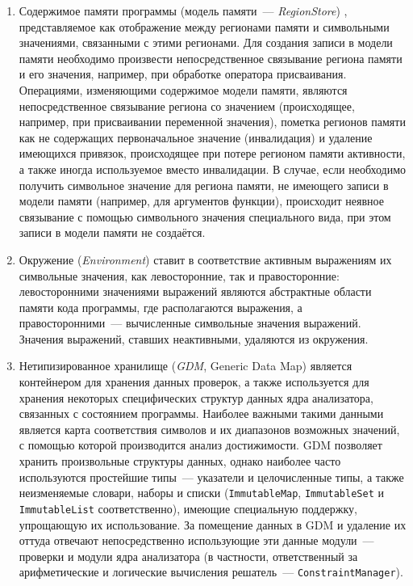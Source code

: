 \begin{enumerate}
 \item Содержимое памяти программы (модель памяти~--- \textit{RegionStore}) \cite{csa-store}, представляемое как отображение между регионами памяти и символьными значениями, связанными с этими регионами. Для создания записи в модели памяти необходимо произвести непосредственное связывание региона памяти и его значения, например, при обработке оператора присваивания. Операциями, изменяющими содержимое модели памяти, являются непосредственное связывание региона со значением (происходящее, например, при присваивании переменной значения), пометка регионов памяти как не содержащих первоначальное значение (инвалидация) и удаление имеющихся привязок, происходящее при потере регионом памяти активности, а также иногда используемое вместо инвалидации. В случае, если необходимо получить символьное значение для региона памяти, не имеющего записи в модели памяти (например, для аргументов функции), происходит неявное связывание с помощью символьного значения специального вида, при этом записи в модели памяти не создаётся.

 \item Окружение (\textit{Environment}) ставит в соответствие активным выражениям их символьные значения, как левосторонние, так и правосторонние: левосторонними значениями выражений являются абстрактные области памяти кода программы, где располагаются выражения, а правосторонними~--- вычисленные символьные значения выражений. Значения выражений, ставших неактивными, удаляются из окружения.
 
 \item Нетипизированное хранилище (\textit{GDM}, Generic Data Map) является контейнером для хранения данных проверок, а также используется для хранения некоторых специфических структур данных ядра анализатора, связанных с состоянием программы. Наиболее важными такими данными является карта соответствия символов и их диапазонов возможных значений, с помощью которой производится анализ достижимости. GDM позволяет хранить произвольные структуры данных, однако наиболее часто используются простейшие типы~--- указатели и целочисленные типы, а также неизменяемые словари, наборы и списки (\texttt{ImmutableMap}, \texttt{ImmutableSet} и \texttt{ImmutableList} соответственно), имеющие специальную поддержку, упрощающую их использование. За помещение данных в GDM и удаление их оттуда отвечают непосредственно использующие эти данные модули~--- проверки и модули ядра анализатора (в частности, ответственный за арифметические и логические вычисления решатель~--- \texttt{ConstraintManager}).
\end{enumerate}

